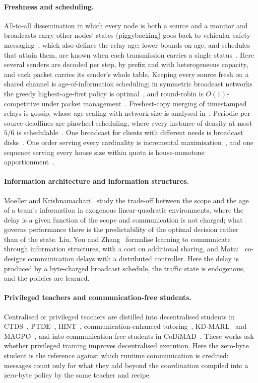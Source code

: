 \documentclass[11pt]{article}
\theoremstyle{definition}
\begin{document}
\paragraph{Freshness and scheduling.} All-to-all dissemination in which every node is both a source and a monitor and
broadcasts carry other nodes' states (piggybacking) goes back to vehicular safety messaging~\cite{kaul2011}, which also
defines the relay age; lower bounds on age, and schedules that attain them, are known when each transmission carries a
single status~\cite{farazi2019}. Here several senders are decoded per step, by prefix and with heterogeneous capacity, and
each packet carries its sender's whole table. Keeping every source fresh on a shared channel is age-of-information scheduling; in
symmetric broadcast networks the greedy highest-age-first policy is optimal~\cite{kadota2018}, and round-robin is
$O(1)$-competitive under packet management~\cite{jien2023}. Freshest-copy merging of timestamped relays is gossip, whose
age scaling with network size is analysed in~\cite{yates2021,selen2013}. Periodic per-source deadlines are pinwheel
scheduling, where every instance of density at most $5/6$ is schedulable~\cite{kawamura2024}. One broadcast for clients
with different needs is broadcast disks~\cite{broadcastdisks}. One order serving every cardinality is incremental
maximisation~\cite{bernstein2022,bienkowski2026}, and one sequence serving every house size within quota is house-monotone
apportionment~\cite{balinski1982}.
\paragraph{Information architecture and information structures.} Moeller and Krishnamachari~\cite{moeller2026} study the
trade-off between the scope and the age of a team's information in exogenous linear-quadratic environments, where the
delay is a given function of the scope and communication is not charged; what governs performance there is the
predictability of the optimal decision rather than of the state. Liu, You and Zhang~\cite{liu2026ltc} formalise learning to
communicate through information structures, with a cost on additional sharing, and Matni~\cite{matni2017} co-designs
communication delays with a distributed controller. Here the delay is produced by a byte-charged broadcast schedule, the
traffic state is endogenous, and the policies are learned.
\paragraph{Privileged teachers and communication-free students.} Centralised or privileged teachers are distilled into
decentralised students in CTDS~\cite{ctds}, PTDE~\cite{ptde}, HINT~\cite{hint}, communication-enhanced tutoring~\cite{tutoring},
KD-MARL~\cite{kdmarl} and MAGPO~\cite{magpo}, and into communication-free students in CoDiMAD~\cite{codimad}. These works
ask whether privileged training improves decentralised execution. Here the zero-byte student is the reference against
which runtime communication is credited: messages count only for what they add beyond the coordination compiled into a
zero-byte policy by the same teacher and recipe.
\end{document}
